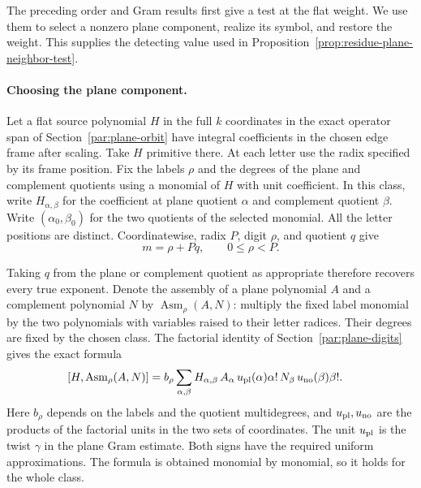 The preceding order and Gram results first give a test at
the flat weight. We use them to select a nonzero plane
component, realize its symbol, and restore the weight. This
supplies the detecting value used in
Proposition~\ref{prop:residue-plane-neighbor-test}.
\paragraph{Choosing the plane component.}
\label{par:plane-flat-test}
\hypertarget{source-plane-flat-test}{}
Let a flat source polynomial \(H\) in the full \(k\) coordinates
in the exact operator span of Section~\ref{par:plane-orbit} have
integral coefficients in the chosen edge frame after scaling.
Take \(H\) primitive there. At each letter use the radix
specified by its frame position. Fix the labels \(\rho\)
and the degrees of the plane and complement quotients using a
monomial of \(H\) with unit coefficient. In this class, write
\(H_{\alpha,\beta}\) for the coefficient at plane quotient
\(\alpha\) and complement quotient \(\beta\). Write
\((\alpha_0,\beta_0)\) for the two quotients of the selected
monomial. All the letter positions are distinct. Coordinatewise, radix \(P\), digit \(\rho\), and quotient \(q\) give
\[
 m=\rho+Pq,\qquad 0\le\rho<P.
\]

Taking \(q\) from the plane or complement quotient as appropriate therefore recovers every true exponent. Denote the assembly of a plane polynomial
\(A\) and a complement polynomial \(N\) by
\(\operatorname{Asm}_\rho(A,N)\): multiply the fixed label
monomial by the two polynomials with variables raised to
their letter radices. Their degrees are fixed by the chosen
class. The factorial identity of Section~\ref{par:plane-digits}
gives the exact formula
\begin{equation}\label{eq:plane-slice-factor}
 \begin{split}
 [H,\operatorname{Asm}_\rho(A,N)]
 &= b_\rho
     \sum_{\alpha,\beta} H_{\alpha,\beta}\,
       A_\alpha\,u_{\rm pl}(\alpha)\alpha!\,
       N_\beta\,u_{\rm no}(\beta)\beta!.
 \end{split}
\end{equation}
Here \(b_\rho\) depends on the labels and the quotient
multidegrees, and \(u_{\rm pl},u_{\rm no}\) are the products
of the factorial units in the two sets of coordinates.
The unit \(u_{\rm pl}\) is the twist \(\gamma\) in the
plane Gram estimate. Both signs have the required uniform
approximations. The formula is obtained monomial by
monomial, so it holds for the whole class.

